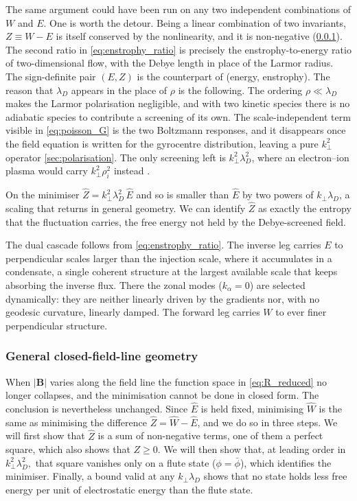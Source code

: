 \documentclass{jpp}
\newcommand{\bB}{\mathbf{B}}
\newcommand{\kperp}{k_\perp}
\newcommand{\lambdaD}{\lambda_D}
\newcommand{\Zhat}{\hat{Z}}
\begin{document}
The same argument could have been run on any two independent combinations of $W$ and $E$. One is worth the detour. Being a linear combination of two invariants, $Z \equiv W - E$ is itself conserved by the nonlinearity, and it is non-negative (\cref{sec:fjortoft_general}). The second ratio in \cref{eq:enstrophy_ratio} is precisely the enstrophy-to-energy ratio of two-dimensional flow, with the Debye length in place of the Larmor radius. The sign-definite pair $(E, Z)$ is the counterpart of (energy, enstrophy). The reason that $\lambda_D$ appears in the place of $\rho$ is the following. The ordering $\rho \ll \lambdaD$ makes the Larmor polarisation negligible, and with two kinetic species there is no adiabatic species to contribute a screening of its own. The scale-independent term visible in \cref{eq:poisson_G} is the two Boltzmann responses, and it disappears once the field equation is written for the gyrocentre distribution, leaving a pure $\kperp^2$ operator \cref{sec:polarisation}. The only screening left is $\kperp^2\lambdaD^2$, where an electron--ion plasma would carry $\kperp^2\rho_i^2$ instead \citep{Dorland1993}. 

On the minimiser $\Zhat = \kperp^2\lambdaD^2\,\hat E$ and so is smaller than $\hat E$ by two powers of $\kperp\lambdaD$, a scaling that returns in general geometry. We can identify $\Zhat$ as exactly the entropy that the fluctuation carries, the free energy not held by the Debye-screened field.

The dual cascade follows from \cref{eq:enstrophy_ratio}. The inverse leg carries $E$ to perpendicular scales larger than the injection scale, where it accumulates in a condensate, a single coherent structure at the largest available scale that keeps absorbing the inverse flux. There the zonal modes ($k_\alpha = 0$) are selected dynamically: they are neither linearly driven by the gradients nor, with no geodesic curvature, linearly damped. The forward leg carries $W$ to ever finer perpendicular structure.

\subsubsection{General closed-field-line geometry}\label{sec:fjortoft_general}

When $|\bB|$ varies along the field line the function space in \cref{eq:R_reduced} no longer collapses, and the minimisation cannot be done in closed form. The conclusion is nevertheless unchanged. Since $\hat E$ is held fixed, minimising $\hat W$ is the same as minimising the difference $\Zhat = \hat W - \hat E$, and we do so in three steps. We will first show that $\Zhat$ is a sum of non-negative terms, one of them a perfect square, which also shows that $Z \geq 0$. We will then show that, at leading order in $\kperp^2\lambdaD^2,$ that square vanishes only on a flute state ($\phi = \bar{\phi}$), which identifies the minimiser. Finally, a bound valid at any $\kperp\lambdaD$ shows that no state holds less free energy per unit of electrostatic energy than the flute state.
\end{document}
